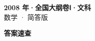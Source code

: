 \documentclass[zihao=-4, a4paper]{ctexart}
\begin{document}
\begin{center}
  {\Large\bfseries 2008 年·全国大纲卷Ⅰ·文科}\\[4pt]
  {\large 数学 · 简答版}
\end{center}
\medskip
{}

\clearpage
{}
\begin{center}{\Large\bfseries 答案速查}\end{center}
\medskip

\end{document}
